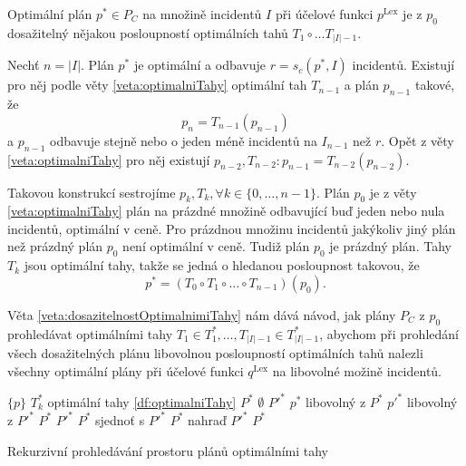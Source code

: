 \begin{veta}\label{veta:dosazitelnostOptimalnimiTahy}
  Optimální plán $p^* \in P_C$ na množině incidentů $I$ při účelové funkci $p^{\text{Lex}}$ je z $p_0$ dosažitelný nějakou posloupností optimálních tahů $T_1 \circ \dots T_{|I|-1}$.
\end{veta}
\begin{dukaz}
  Nechť $n = |I|$.
  Plán $p^*$ je optimální a odbavuje $r = s_c(p^*, I)$ incidentů.
  Existují pro něj podle věty \ref{veta:optimalniTahy} optimální tah $T_{n-1}$ a plán $p_{n-1}$ takové, že
  \begin{equation*}
    p_n = T_{n-1}(p_{n-1})
  \end{equation*}
  a $p_{n-1}$ odbavuje stejně nebo o jeden méně incidentů na $I_{n-1}$ než $r$.
  Opět z věty \ref{veta:optimalniTahy} pro něj existují $p_{n-2}, T_{n-2} \colon p_{n-1} = T_{n-2}(p_{n-2})$.

  Takovou konstrukcí sestrojíme $p_{k}, T_{k}, \forall k \in \{ 0, \dots, n-1 \}$. 
  Plán $p_0$ je z věty \ref{veta:optimalniTahy} plán na prázdné množině odbavující buď jeden nebo nula incidentů, optimální v ceně.
  Pro prázdnou množinu incidentů jakýkoliv jiný plán než prázdný plán $p_0$ není optimální v ceně.
  Tudiž plán $p_0$ je prázdný plán.
  Tahy $T_k$ jsou optimální tahy, takže se jedná o hledanou posloupnost takovou, že
  \begin{equation*}
    p^* = (T_0 \circ T_1 \circ \dots \circ T_{n-1})(p_0).
  \end{equation*}
\end{dukaz}

Věta \ref{veta:dosazitelnostOptimalnimiTahy} nám dává návod, jak plány $P_C$ z $p_0$ prohledávat optimálními tahy $T_1 \in T^*_1, \dots , T_{|I| - 1} \in T^*_{|I|-1}$,
abychom při prohledání všech dosažitelných plánu libovolnou posloupností optimálních tahů nalezli všechny optimální plány při účelové funkci $q^{\text{Lex}}$ na libovolné možině incidentů.

\begin{algorithm}[h]
  \begin{algorithmic}[1]
      \State \Return $\{ p \}$
    \EndIf
    \State $T^*_k$ \gets optimální tahy \ref{df:optimalniTahy}
    \State $P^*$ \gets $\emptyset$
      \State $P'^*$ \gets {}
      \State $p^*$ \gets libovolný z $P^*$
      \State $p'^*$ \gets libovolný z $P'^*$
        \State $P^*$ \gets $P'^*$ 
        \State $P^*$ sjednoť s $P'^*$
        \State $P^*$ nahraď $P'^*$
      \EndIf
    \EndFor
    \State \Return $P^*$
  \EndFunction
  \end{algorithmic}
  \caption{Rekurzivní prohledávání prostoru plánů optimálními tahy}
  \label{alg:rekProhPlanu}
\end{algorithm}

